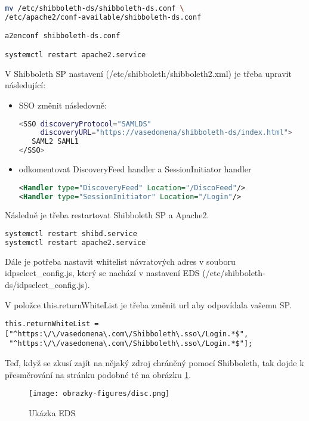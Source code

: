 \begin{lstlisting}[language=Bash]
mv /etc/shibboleth-ds/shibboleth-ds.conf \
/etc/apache2/conf-available/shibboleth-ds.conf

a2enconf shibboleth-ds.conf

systemctl restart apache2.service
\end{lstlisting}

V Shibboleth SP nastavení (/etc/shibboleth/shibboleth2.xml) je třeba upravit následující:\\
 \begin{itemize}
    \item
SSO změnit následovně:

\begin{lstlisting}[language=Bash]
<SSO discoveryProtocol="SAMLDS" 
     discoveryURL="https://vasedomena/shibboleth-ds/index.html">
   SAML2 SAML1
</SSO>
\end{lstlisting}
\item
odkomentovat DiscoveryFeed handler a SessionInitiator handler

\begin{lstlisting}[language=xml]
<Handler type="DiscoveryFeed" Location="/DiscoFeed"/>
<Handler type="SessionInitiator" Location="/Login"/>
\end{lstlisting}
\end{itemize}
Následně je třeba restartovat Shibboleth SP a Apache2.

\begin{lstlisting}[language=Bash]
systemctl restart shibd.service
systemctl restart apache2.service
\end{lstlisting}

Dále je potřeba nastavit whitelist návratových adres v souboru idpselect\_config.js, který se nachází v nastavení EDS (/etc/shibboleth-ds/idpselect\_config.js).

V položce this.returnWhiteList je třeba změnit url aby odpovídala vašemu SP. 

\begin{lstlisting}[]
this.returnWhiteList = 
["^https:\/\/vasedomena\.com\/Shibboleth\.sso\/Login.*$",
 "^https:\/\/vasedomena\.com\/Shibboleth\.sso\/Login.*$"];
\end{lstlisting}

Teď, když se zkusí zajít na nějaký zdroj chráněný pomocí Shibboleth, tak dojde k přesměrování na stránku podobné té na obrázku \ref{EDS}.

\begin{figure}[bp]
	\centering
    \texttt{[image: obrazky-figures/disc.png]}
	\caption{Ukázka EDS}
	\label{EDS}
\end{figure}

